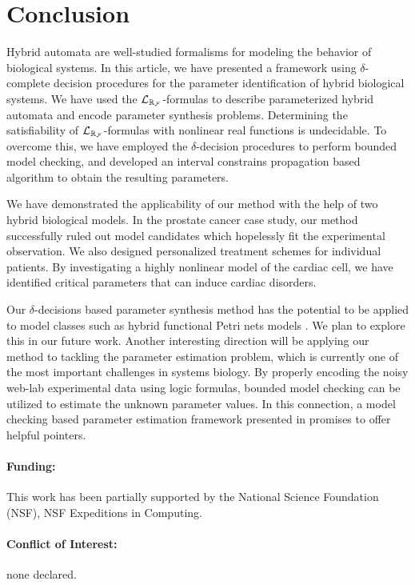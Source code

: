 \section{Conclusion} %
Hybrid automata are well-studied formalisms for modeling the behavior of biological systems. In this article, we have presented a framework using $\delta$-complete decision procedures for the parameter identification of hybrid biological systems. We have used the $\mathcal{L}_{\mathbb{R}_{\mathcal{F}}}$-formulas to describe parameterized hybrid automata and encode parameter synthesis problems. Determining the satisfiability of $\mathcal{L}_{\mathbb{R}_{\mathcal{F}}}$-formulas with nonlinear real functions is undecidable. To overcome this, we have employed the $\delta$-decision procedures to perform bounded model checking, and developed an interval constrains propagation based algorithm to obtain the resulting parameters.

We have demonstrated the applicability of our method with the help of two hybrid biological models. In the prostate cancer case study, our method successfully ruled out model candidates which hopelessly fit the experimental observation. We also designed personalized treatment schemes for individual patients. By investigating a highly nonlinear model of the cardiac cell, we have identified critical parameters that can induce cardiac disorders.

Our $\delta$-decisions based parameter synthesis method has the potential to be applied to model classes such as hybrid functional Petri nets models \citep{hfpn}. We plan to explore this in our future work. Another interesting direction will be applying our method to tackling the parameter estimation problem, which is currently one of the most important challenges in systems biology. By properly encoding the noisy web-lab experimental data using logic formulas, bounded model checking can be utilized to estimate the unknown parameter values. In this connection, a model checking based parameter estimation framework presented in \cite{liu13} promises to offer helpful pointers.






\paragraph{Funding:} This work has been partially supported by the National Science Foundation (NSF), NSF Expeditions in Computing.

\paragraph{Conﬂict of Interest:} none declared.
